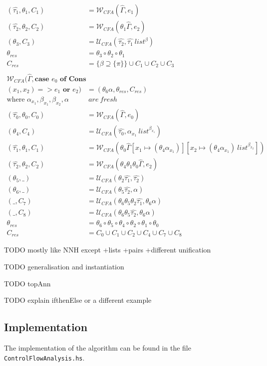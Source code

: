 \documentclass[a4paper,11pt]{article}
\newcommand{\bigU}{\ensuremath{\mathcal{U}_{CFA}}\xspace}
\newcommand{\bigW}{\ensuremath{\mathcal{W}_{CFA}}\xspace}
\begin{document}
\begin{align*}
  (\hat{\tau_1}, \theta_1, C_1) &= \bigW (\hat{\Gamma}, e_1)\\
  (\hat{\tau_2}, \theta_2, C_2) &= \bigW (\theta_1 \hat{\Gamma}, e_2)\\
  (\theta_3, C_3) &= \bigU (\hat{\tau_2}, \hat{\tau_1} ~ list^\beta)\\
  \theta_{res} &= \theta_3 \circ \theta_2 \circ \theta_1\\
  C_{res} &= \{\beta \supseteq \{\pi\}\} \cup C_1 \cup C_2 \cup C_3\\
  \\
  \bigW (\hat{\Gamma}, \textbf{case }e_0\textbf{ of Cons}\\(x_1,x_2) => e_1\textbf{ or }e_2) &= (\theta_6 \alpha, \theta_{res}, C_{res})\\
  \text{where }\alpha_{x_1}, \beta_{x_1}, \beta_{x_2}, \alpha & ~are~fresh\\
  (\hat{\tau_0}, \theta_0, C_0) &= \bigW (\hat{\Gamma}, e_0) \\
  (\theta_4, C_4) &= \bigU (\hat{\tau_0}, \alpha_{x_1} ~ list^{\beta_{x_1}})\\
  (\hat{\tau_1}, \theta_1, C_1) &= \bigW (\theta_0 \hat{\Gamma}[x_1 \mapsto (\theta_4 \alpha_{x_1})][x_2 \mapsto (\theta_4 \alpha_{x_1}) ~ list^{\beta_{x_2}}])\\
  (\hat{\tau_2}, \theta_2, C_2) &= \bigW (\theta_4 \theta_1 \theta_0 \hat{\Gamma}, e_2)\\
  (\theta_5, \_) &= \bigU (\theta_2 \hat{\tau_1}, \hat{\tau_2})\\
  (\theta_6, \_) &= \bigU (\theta_5 \hat{\tau_2}, \alpha)\\
  (\_, C_7) &= \bigU (\theta_6 \theta_5 \theta_2 \hat{\tau_1}, \theta_6 \alpha)\\
  (\_, C_8) &= \bigU (\theta_6 \theta_5 \hat{\tau_2}, \theta_6 \alpha)\\
  \theta_{res} &= \theta_6 \circ \theta_5 \circ \theta_4 \circ \theta_2 \circ \theta_1 \circ \theta_0\\
  C_{res} &= C_0 \cup C_1 \cup C_2 \cup C_4 \cup C_7 \cup C_8
\end{align*}

TODO mostly like NNH except +lists +pairs +different unification 

TODO generalisation and instantiation

TODO topAnn

TODO explain ifthenElse or a different example 

\subsection{Implementation}
The implementation of the algorithm can be found in the file \texttt{ControlFlowAnalysis.hs}. 
\end{document}
